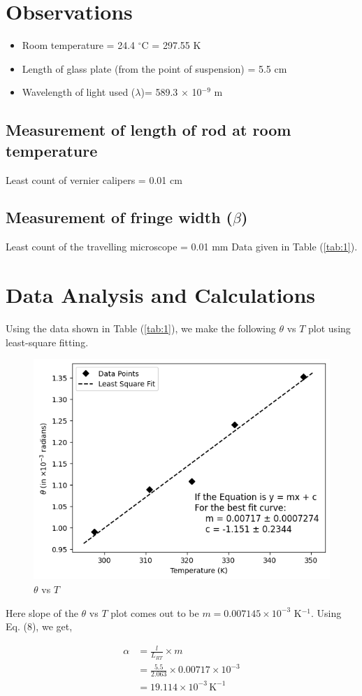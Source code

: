 \section{Observations}

\begin{itemize}
    \item Room temperature = 24.4 $^{\circ}$C = 297.55 K
    \item Length of glass plate (from the point of suspension) = 5.5 cm
    \item Wavelength of light used ($\lambda$)= 589.3 $\times$ 10$^{-9}$ m
\end{itemize}

\subsection*{Measurement of length of rod at room temperature}
Least count of vernier calipers = 0.01 cm


\subsection*{Measurement of fringe width ($\beta$)}
Least count of the travelling microscope = 0.01 mm
Data given in Table (\ref{tab:1}).


\section{Data Analysis and Calculations}

Using the data shown in Table (\ref{tab:1}), we make the following $\theta$ vs $T$ 
plot using least-square fitting.

\begin{figure}[H]
    \centering
    \includegraphics[width=1\columnwidth]{images/g1.png}
    \caption{$\theta$ vs $T$}
    \label{graph}
\end{figure}

Here slope of the $\theta$ vs $T$ plot comes out to be $m=0.007145 \times 10^{-3}$ K$^{-1}$. Using Eq. (8), we get,

\begin{align*}
    \alpha &= \frac{l}{L_{RT}} \times m\\
    &= \frac{5.5}{2.063} \times 0.00717 \times 10^{-3}\\
    &= 19.114 \times 10^{-3}\,\text{K}^{-1}
\end{align*}